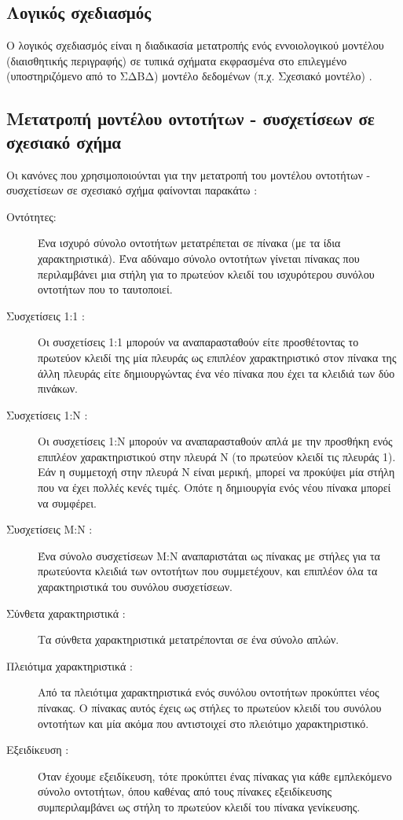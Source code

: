 \documentclass{assignment}
\begin{document}
\subsection{Λογικός σχεδιασμός}

Ο λογικός σχεδιασμός είναι η διαδικασία μετατροπής ενός εννοιολογικού μοντέλου (διαισθητικής περιγραφής) σε τυπικά σχήματα εκφρασμένα στο επιλεγμένο (υποστηριζόμενο από το ΣΔΒΔ) μοντέλο δεδομένων (π.χ. Σχεσιακό μοντέλο) \cite{class_notes}.

\subsection{Μετατροπή μοντέλου οντοτήτων - συσχετίσεων σε σχεσιακό σχή\-μα}

Οι κανόνες που χρησιμοποιούνται για την μετατροπή του μοντέλου οντοτήτων - συσχετίσεων σε σχεσιακό σχήμα φαίνονται παρακάτω \cite{class_notes}:

\begin{description}

  \item[Οντότητες:] Ένα ισχυρό σύνολο οντοτήτων μετατρέπεται σε πίνακα (με τα ίδια χαρακτηριστικά). Ένα αδύναμο σύνολο οντοτήτων γίνεται πίνακας που περιλαμβάνει μια στήλη για το πρωτεύον κλειδί του ισχυρότερου συνόλου οντοτήτων που το ταυτοποιεί. 
  \item[Συσχετίσεις 1:1 :] Οι συσχετίσεις 1:1 μπορούν να αναπαρασταθούν είτε προσθέτοντας το πρωτεύον κλειδί της μία πλευράς ως επιπλέον χαρακτηριστικό στον πίνακα της άλλη πλευράς είτε δημιουργώντας ένα νέο πίνακα που έχει τα κλειδιά των δύο πινάκων.
  \item[Συσχετίσεις 1:Ν :] Οι συσχετίσεις 1:Ν μπορούν να αναπαρασταθούν απλά με την προσθήκη ενός επιπλέον χαρακτηριστικού στην πλευρά Ν (το πρωτεύον κλειδί τις πλευράς 1). Εάν η συμμετοχή στην πλευρά Ν είναι μερική, μπορεί να προκύψει μία στήλη που να έχει πολλές κενές τιμές. Οπότε η δημιουργία ενός νέου πίνακα μπορεί να συμφέρει.
  \item[Συσχετίσεις Μ:Ν :] Ένα σύνολο συσχετίσεων M:N αναπαριστάται ως πίνακας με στήλες για τα πρωτεύοντα κλειδιά των οντοτήτων που συμμετέχουν, και επιπλέον όλα τα χαρακτηριστικά του συνόλου συσχετίσεων. 
  \item[Σύνθετα χαρακτηριστικά :] Τα σύνθετα χαρακτηριστικά μετατρέπονται σε ένα σύνολο απλών.
  \item[Πλειότιμα χαρακτηριστικά :] Από τα πλειότιμα χαρακτηριστικά ενός συνόλου οντοτήτων προκύπτει νέος πίνακας. Ο πίνακας αυτός έχεις ως στήλες το πρωτεύον κλειδί του συνόλου οντοτήτων και μία ακόμα που αντιστοιχεί στο πλειότιμο χαρακτηριστικό.
  \item[Εξειδίκευση :] Όταν έχουμε εξειδίκευση, τότε προκύπτει ένας πίνακας για κάθε εμπλεκόμενο σύνολο οντοτήτων, όπου καθένας από τους πίνακες εξειδίκευσης συμπεριλαμβάνει ως στήλη το πρωτεύον κλειδί του πίνακα γενίκευσης.
 
\end{description}
\end{document}
